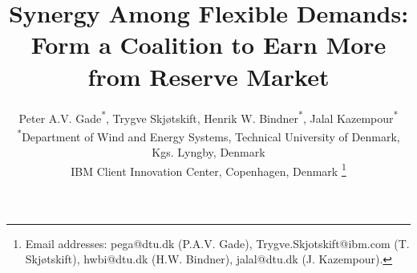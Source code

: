 \documentclass[lettersize,journal]{IEEEtran}
\begin{document}
\title{Synergy Among Flexible Demands: Form a Coalition to Earn More from Reserve Market}

\author{Peter A.V. Gade\textsuperscript{*}\textsuperscript{\textdagger}, Trygve Skjøtskift\textsuperscript{\textdagger}, Henrik W. Bindner\textsuperscript{*}, Jalal Kazempour\textsuperscript{*} \\
    \textsuperscript{*}Department of Wind and Energy Systems, Technical University of Denmark, Kgs. Lyngby, Denmark \\
    \textsuperscript{\textdagger}IBM Client Innovation Center, Copenhagen, Denmark
    \thanks{
    Email addresses: pega@dtu.dk (P.A.V. Gade), Trygve.Skjotskift@ibm.com (T. Skjøtskift), hwbi@dtu.dk (H.W. Bindner), jalal@dtu.dk (J. Kazempour).}%

\vspace{-8mm}
}




\maketitle

\end{document}

